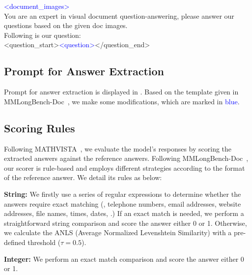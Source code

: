 \begin{tcolorbox}[colback=gray!5]
\small
\textcolor{blue}{<document\_images>} \\

You are an expert in visual document question-answering, please answer our questions based
on the given doc images.\\

Following is our question:\\
<question\_start>\textcolor{blue}{<question>}</question\_end>

\label{text:prompt_for_response_generation}
\end{tcolorbox}


\subsection{Prompt for Answer Extraction}
\label{xsubsec:prompt_of_answer_extract}

Prompt for answer extraction is displayed in . Based on the template given in MMLongBench-Doc~\cite{MMLongBench-Doc}, we make some modifications, which are marked in \textcolor{blue}{blue}.





\subsection{Scoring Rules}
\label{xsubsec:scoring_rules_details}

Following MATHVISTA~\cite{MATHVISTA}, we evaluate the model's responses by scoring the extracted answers against the reference answers. Following MMLongBench-Doc~\cite{MMLongBench-Doc}, our scorer is rule-based and employs different strategies according to the format of the reference answer. We detail its rules as below:

\noindent\textbf{String:} We firstly use a series of regular expressions to determine whether the answers require exact matching (\eg, telephone numbers, email addresses, website addresses, file names, times, dates, \etc.) If an exact match is needed, we perform a straightforward string comparison and score the answer either 0 or 1. Otherwise, we calculate the ANLS (Average Normalized Levenshtein Similarity) with a pre-defined threshold ($\tau = 0.5$).

\noindent\textbf{Integer:} We perform an exact match comparison and score the answer either 0 or 1.

